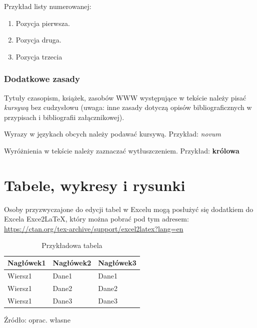 \documentclass[twoside,a4paper,12pt]{report} %
\theoremstyle{break}
\begin{document}
Przykład listy numerowanej:
\begin{enumerate}[label=\Alph*.,start=4]
    \item Pozycja pierwsza.
    \item Pozycja druga.
    \item Pozycja trzecia
\end{enumerate}\bigskip

\subsubsection{Dodatkowe zasady}
Tytuły czasopism, książek, zasobów WWW występujące w tekście należy pisać {\it kursywą} bez cudzysłowu (uwaga: inne zasady dotyczą opisów bibliograficznych w przypisach i bibliografii załącznikowej).
\par
Wyrazy w językach obcych należy podawać kursywą. Przykład: {\it novum} 
\par
Wyróżnienia w tekście należy zaznaczać wytłuszczeniem. Przykład: {\bf królowa} \par

\newpage
\section{Tabele, wykresy i rysunki}

Osoby przyzwyczajone do edycji tabel w Excelu mogą posłużyć się dodatkiem do Excela Exce2LaTeX, który można pobrać pod tym adresem: \url{https://ctan.org/tex-archive/support/excel2latex?lang=en}\bigskip

\lipsum[1]%

\begin{table}[ht]%
\caption{Przykładowa tabela}
\label{tab:tab1}
\begin{tabular}{|l|l|p{5cm}|}%
    \hline
    Nagłówek1 & Nagłówek2 & Nagłówek3 \\ \hline
    Wiersz1 & Dane1 & Dane1 \\ \hline
    Wiersz1 & Dane2 & Dane2  \\ \hline
    Wiersz1 & Dane3 & Dane3 \\ \hline
\end{tabular}
\begin{tablenotes}
      \small
      \item Źródło: oprac. własne
    \end{tablenotes}

\end{table}
\end{document}
